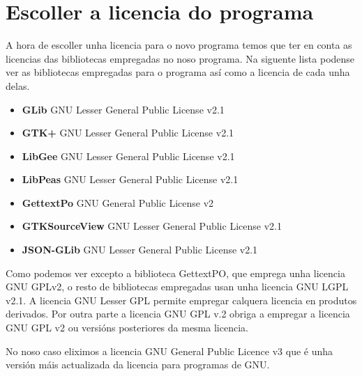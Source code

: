 \chapter{Escoller a licencia do programa}

A hora de escoller unha licencia para o novo programa temos que ter en conta as licencias das bibliotecas empregadas no noso programa. Na siguente lista podense ver as bibliotecas empregadas para o programa así como a licencia de cada unha delas.

\begin{itemize}
  \item \textbf{GLib} GNU Lesser General Public License v2.1
  \item \textbf{GTK+} GNU Lesser General Public License v2.1
  \item \textbf{LibGee}  GNU Lesser General Public License v2.1
  \item \textbf{LibPeas} GNU Lesser General Public License v2.1
  \item \textbf{GettextPo} GNU General Public License v2
  \item \textbf{GTKSourceView} GNU Lesser General Public License v2.1
  \item \textbf{JSON-GLib} GNU Lesser General Public License v2.1
\end{itemize}

Como podemos ver excepto a biblioteca GettextPO, que emprega unha licencia GNU GPLv2, o resto de bibliotecas empregadas usan unha licencia GNU LGPL v2.1. A licencia GNU Lesser GPL permite empregar calquera licencia en produtos derivados. Por outra parte a licencia GNU GPL v.2 obriga a empregar a licencia GNU GPL v2 ou versións posteriores da mesma licencia.

No noso caso eliximos a licencia GNU General Public Licence v3 que é unha versión máis actualizada da licencia para programas de GNU.
